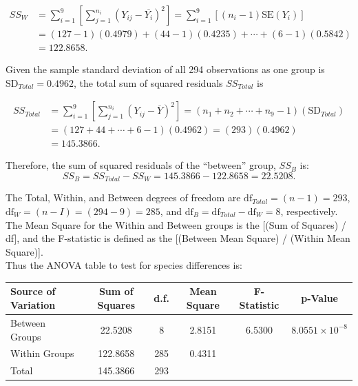 \documentclass[11pt]{exam} %
\begin{document}
\begin{questions}
\begin{parts}
\begin{align*}
SS_W &= \sum_{i=1}^9 \left[ \sum_{j=1}^{n_i} \left( Y_{ij} - \overline{Y_i} \right)^2  \right] = \sum_{i=1}^9 \left[ (n_i - 1) \text{SE}(Y_i)  \right] \\
&= (127 - 1)(0.4979) + (44 - 1)(0.4235) + \cdots + (6 - 1)(0.5842) \\
&= 122.8658.
\end{align*}

Given the sample standard deviation of all 294 observations as one group is $\text{SD}_{Total} = 0.4962$, the total sum of squared residuals $SS_{Total}$ is

\begin{align*}
SS_{Total} &= \sum_{i=1}^9 \left[ \sum_{j=1}^{n_i} \left( Y_{ij} - \overline{Y} \right)^2  \right] = (n_1 + n_2 + \cdots + n_9 - 1) (\text{SD}_{Total}) \\
&= (127 + 44 + \cdots + 6 - 1)(0.4962) =  (293)(0.4962)\\
&= 145.3866.
\end{align*}

Therefore, the sum of squared residuals of the ``between'' group, $SS_B$ is:
$$SS_B = SS_{Total} - SS_W = 145.3866 - 122.8658 = 22.5208.$$

The Total, Within, and Between degrees of freedom are $\text{df}_{Total} = (n-1) = 293$, $\text{df}_W = (n-I)=(294-9) = 285$, and $\text{df}_B = \text{df}_{Total} - \text{df}_W  = 8$, respectively. \\

The Mean Square for the Within and Between groups is the [(Sum of Squares) / df], and the F-statistic is defined as the [(Between Mean Square) / (Within Mean Square)]. \\

Thus the ANOVA table to test for species differences is:

\begin{center}
  \begin{tabular}{ l c c c c c}
    Source of Variation & Sum of Squares & d.f. & Mean Square & F-Statistic & p-Value \\ \hline \hline
    Between Groups & 22.5208 & 8 & 2.8151 & 6.5300 & $8.0551 \times 10^{-8}$ \\
    Within Groups & 122.8658 & 285 & 0.4311 & & \\ \hline
    Total & 145.3866 & 293 & & &
  \end{tabular}
\end{center}


\end{parts}
\end{questions}
\end{document}

